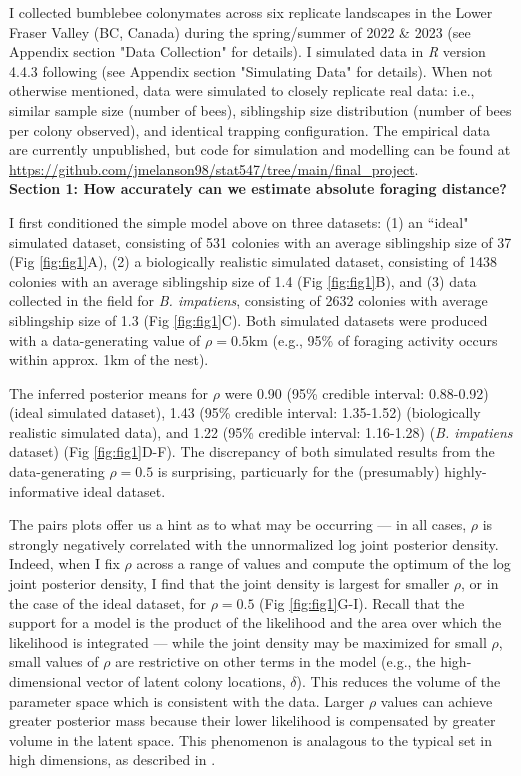 \documentclass[11pt]{article}
\begin{document}
I collected bumblebee colonymates across six replicate landscapes in the Lower Fraser Valley (BC, Canada) during the spring/summer of 2022 \& 2023 (see Appendix section "Data Collection" for details). I simulated data in \emph{R} version 4.4.3 \parencite{r_core_team_r_2021} following \textcite{pope_inferring_2017} (see Appendix section "Simulating Data" for details). When not otherwise mentioned, data were simulated to closely replicate real data: i.e., similar sample size (number of bees), siblingship size distribution (number of bees per colony observed), and identical trapping configuration. The empirical data are currently unpublished, but code for simulation and modelling can be found at \url{https://github.com/jmelanson98/stat547/tree/main/final_project}. \\

\noindent \textbf{Section 1: How accurately can we estimate absolute foraging distance?}

I first conditioned the simple model above on three datasets: (1) an ``ideal" simulated dataset, consisting of 531 colonies with an average siblingship size of 37 (Fig \ref{fig:fig1}A), (2) a biologically realistic simulated dataset, consisting of 1438 colonies with an average siblingship size of 1.4 (Fig \ref{fig:fig1}B), and (3) data collected in the field for \emph{B. impatiens}, consisting of 2632 colonies with average siblingship size of 1.3 (Fig \ref{fig:fig1}C). Both simulated datasets were produced with a data-generating value of $\rho = 0.5$km (e.g., 95\% of foraging activity occurs within approx. 1km of the nest). 

The inferred posterior means for $\rho$ were 0.90 (95\% credible interval: 0.88-0.92) (ideal simulated dataset), 1.43 (95\% credible interval: 1.35-1.52) (biologically realistic simulated data), and 1.22 (95\% credible interval: 1.16-1.28) (\emph{B. impatiens} dataset) (Fig \ref{fig:fig1}D-F). The discrepancy of both simulated results from the data-generating $\rho = 0.5$ is surprising, particuarly for the (presumably) highly-informative ideal dataset. 

The pairs plots offer us a hint as to what may be occurring --- in all cases, $\rho$ is strongly negatively correlated with the unnormalized log joint posterior density. Indeed, when I fix $\rho$ across a range of values and compute the optimum of the log joint posterior density, I find that the joint density is largest for smaller $\rho$, or in the case of the ideal dataset, for $\rho = 0.5$ (Fig \ref{fig:fig1}G-I). Recall that the support for a model is the product of the likelihood and the area over which the likelihood is integrated --- while the joint density may be maximized for small $\rho$, small values of $\rho$ are restrictive on other terms in the model (e.g., the high-dimensional vector of latent colony locations, $\delta$). This reduces the volume of the parameter space which is consistent with the data. Larger $\rho$ values can achieve greater posterior mass because their lower likelihood is compensated by greater volume in the latent space. This phenomenon is analagous to the typical set in high dimensions, as described in \textcite{betancourt_conceptual_2018}.
\end{document}

